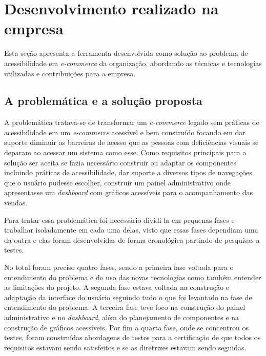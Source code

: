 \section{Desenvolvimento realizado na empresa}
\label{sec:desenvolvimento}

{Esta seção apresenta a ferramenta desenvolvida como solução ao problema de acessibilidade em  \textit{e-commerce} da organização, abordando as técnicas e tecnologias utilizadas e contribuições para a empresa.}

\subsection{A problemática e a solução proposta}

{A problemática tratava-se de transformar um \textit{e-commerce} legado sem práticas de acessibilidade em um \textit{e-commerce} acessível e bem construído focando em dar suporte diminuir as barreiras de acesso que as pessoas com deficiências visuais se deparam ao acessar um sistema como esse. Como requisitos principais para a solução ser aceita se fazia necessário construir ou adaptar os componentes incluindo práticas de acessibilidade, dar suporte a diversos tipos de navegações que o usuário pudesse escolher, construir um painel administrativo onde apresentasse um \textit{dashboard} com gráficos acessíveis para o acompanhamento das vendas.

Para tratar essa problemática foi necessário dividi-la em pequenas fases e trabalhar isoladamente em cada uma delas, visto que essas fases dependiam uma da outra e elas foram desenvolvidas de forma cronológica partindo de pesquisas a testes. 

No total foram preciso quatro fases, sendo a primeira fase voltada para o entendimento do problema e do uso das novas tecnologias como também entender as limitações do projeto. A segunda fase estava voltada na construção e adaptação da interface do usuário seguindo tudo o que foi levantado na fase de entendimento do problema. A terceira fase teve foco na construção do painel administrativo e no \textit{dashboard}, além do planejamento de componentes e na construção de gráficos acessíveis. Por fim a quarta fase, onde se concentrou os testes, foram construídas abordagens de testes para a certificação de que todos os requisitos estavam sendo satisfeitos e se as diretrizes estavam sendo seguidas.

}

